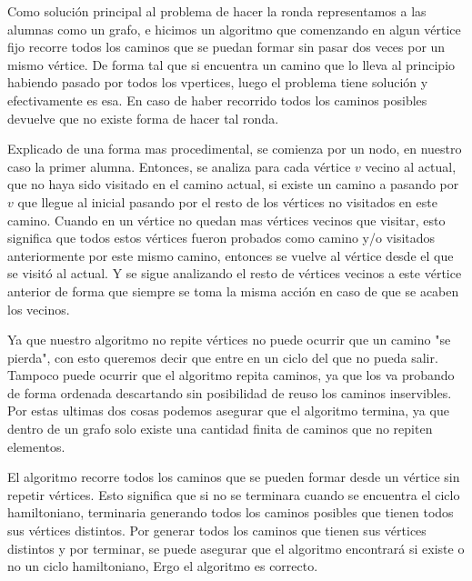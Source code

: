 Como solución principal al problema de hacer la ronda representamos a las alumnas como un grafo, e hicimos un algoritmo que comenzando en algun vértice fijo recorre todos los caminos que se puedan formar sin pasar dos veces por un mismo vértice. De forma tal que si encuentra un camino que lo lleva al principio habiendo pasado por todos los vpertices, luego el problema tiene solución y efectivamente es esa. En caso de haber recorrido todos los caminos posibles devuelve que no existe forma de hacer tal ronda.

Explicado de una forma mas procedimental, se comienza por un nodo, en nuestro caso la primer alumna. Entonces, se analiza para cada vértice $v$ vecino al actual, que no haya sido visitado en el camino actual, si existe un camino a pasando por $v$ que llegue al inicial pasando por el resto de los vértices no visitados en este camino. Cuando en un vértice no quedan mas vértices vecinos que visitar, esto significa que todos estos vértices fueron probados como camino y/o visitados anteriormente por este mismo camino, entonces se vuelve al vértice desde el que se visitó al actual. Y se sigue analizando el resto de vértices vecinos a este vértice anterior de forma que siempre  se toma la misma acción en caso de que se acaben los vecinos.

Ya que nuestro algoritmo no repite vértices no puede ocurrir que un camino "se pierda", con esto queremos decir que entre en un ciclo del que no pueda salir. Tampoco puede ocurrir que el algoritmo repita caminos, ya que los va probando de forma ordenada descartando sin posibilidad de reuso los caminos inservibles. Por estas ultimas dos cosas podemos asegurar que el algoritmo termina, ya que dentro de un grafo solo existe una cantidad finita de caminos que no repiten elementos.

El algoritmo recorre todos los caminos que se pueden formar desde un vértice sin repetir vértices. Esto significa que si no se terminara cuando se encuentra el ciclo hamiltoniano, terminaria generando todos los caminos posibles que tienen todos sus vértices distintos. Por generar todos los caminos que tienen sus vértices distintos y por terminar, se puede asegurar que el algoritmo encontrará si existe o no un ciclo hamiltoniano, Ergo el algoritmo es correcto.
